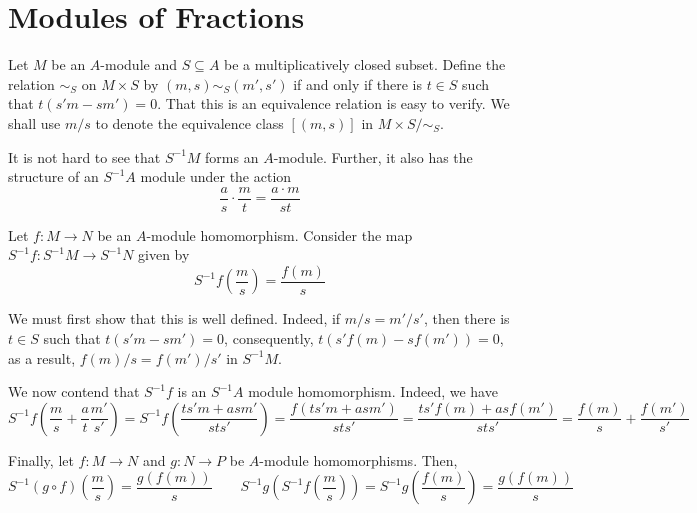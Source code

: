\section{Modules of Fractions}

Let $M$ be an $A$-module and $S\subseteq A$ be a multiplicatively closed subset. Define the relation $\sim_S$ on $M\times S$ by $(m,s)\sim_S(m',s')$ if and only if there is $t\in S$ such that $t(s'm - sm') = 0$. That this is an equivalence relation is easy to verify. We shall use $m/s$ to denote the equivalence class $[(m,s)]$ in $M\times S/\sim_S$.

It is not hard to see that $S^{-1}M$ forms an $A$-module. Further, it also has the structure of an $S^{-1}A$ module under the action 
\begin{equation*}
    \frac{a}{s}\cdot\frac{m}{t} = \frac{a\cdot m}{st}
\end{equation*}

Let $f: M\to N$ be an $A$-module homomorphism. Consider the map $S^{-1}f: S^{-1}M\to S^{-1}N$ given by 
\begin{equation*}
    S^{-1}f\left(\frac{m}{s}\right) = \frac{f(m)}{s}
\end{equation*}

We must first show that this is well defined. Indeed, if $m/s = m'/s'$, then there is $t\in S$ such that $t(s'm - sm') = 0$, consequently, $t(s'f(m) - sf(m')) = 0$, as a result, $f(m)/s = f(m')/s'$ in $S^{-1}M$. 

We now contend that $S^{-1}f$ is an $S^{-1}A$ module homomorphism. Indeed, we have 
\begin{equation*}
    S^{-1}f\left(\frac{m}{s} + \frac{a}{t}\frac{m'}{s'}\right) = S^{-1}f\left(\frac{ts' m + as m'}{sts'}\right) = \frac{f(ts'm + asm')}{sts'} = \frac{ts'f(m) + asf(m')}{sts'} = \frac{f(m)}{s} + \frac{f(m')}{s'}
\end{equation*}

Finally, let $f: M\to N$ and $g: N\to P$ be $A$-module homomorphisms. Then, 
\begin{equation*}
    S^{-1}(g\circ f)\left(\frac{m}{s}\right) = \frac{g(f(m))}{s}\qquad S^{-1}g\left(S^{-1}f\left(\frac{m}{s}\right)\right) = S^{-1}g\left(\frac{f(m)}{s}\right) = \frac{g(f(m))}{s}
\end{equation*}

